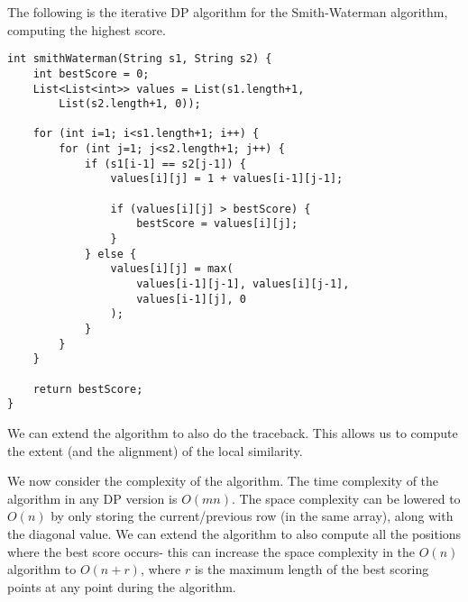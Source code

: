 \documentclass[a4paper, openany]{memoir}
\begin{document}
    The following is the iterative DP algorithm for the Smith-Waterman algorithm, computing the highest score.
\begin{lstlisting}[language=pseudocode]
int smithWaterman(String s1, String s2) {
    int bestScore = 0;
    List<List<int>> values = List(s1.length+1, 
        List(s2.length+1, 0));

    for (int i=1; i<s1.length+1; i++) {
        for (int j=1; j<s2.length+1; j++) {
            if (s1[i-1] == s2[j-1]) {
                values[i][j] = 1 + values[i-1][j-1];

                if (values[i][j] > bestScore) {
                    bestScore = values[i][j];
                }
            } else {
                values[i][j] = max(
                    values[i-1][j-1], values[i][j-1],
                    values[i-1][j], 0
                );
            }
        }
    }

    return bestScore;
}
\end{lstlisting}
    We can extend the algorithm to also do the traceback. This allows us to compute the extent (and the alignment) of the local similarity.

    We now consider the complexity of the algorithm. The time complexity of the algorithm in any DP version is $O(mn)$. The space complexity can be lowered to $O(n)$ by only storing the current/previous row (in the same array), along with the diagonal value. We can extend the algorithm to also compute all the positions where the best score occurs- this can increase the space complexity in the $O(n)$ algorithm to $O(n+r)$, where $r$ is the maximum length of the best scoring points at any point during the algorithm.
\end{document}
